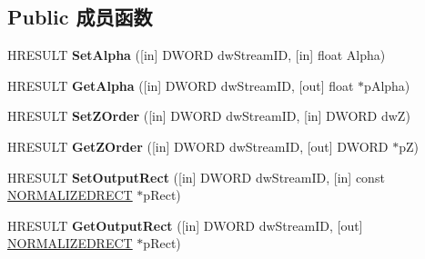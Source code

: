 \subsection*{Public 成员函数}
\begin{DoxyCompactItemize}
\item 
\mbox{\label{interface_i_v_m_r_mixer_control_a945398a75245376e673eef8d670ee8ea}} 
H\+R\+E\+S\+U\+LT {\bfseries Set\+Alpha} (\mbox{[}in\mbox{]} D\+W\+O\+RD dw\+Stream\+ID, \mbox{[}in\mbox{]} float Alpha)
\item 
\mbox{\label{interface_i_v_m_r_mixer_control_abc56a560bc55e58c50e1953df50ef94d}} 
H\+R\+E\+S\+U\+LT {\bfseries Get\+Alpha} (\mbox{[}in\mbox{]} D\+W\+O\+RD dw\+Stream\+ID, \mbox{[}out\mbox{]} float $\ast$p\+Alpha)
\item 
\mbox{\label{interface_i_v_m_r_mixer_control_a9f0a869204a6851c23c1bc183b7a43ba}} 
H\+R\+E\+S\+U\+LT {\bfseries Set\+Z\+Order} (\mbox{[}in\mbox{]} D\+W\+O\+RD dw\+Stream\+ID, \mbox{[}in\mbox{]} D\+W\+O\+RD dwZ)
\item 
\mbox{\label{interface_i_v_m_r_mixer_control_a538097d41cedb5271b295a8618583782}} 
H\+R\+E\+S\+U\+LT {\bfseries Get\+Z\+Order} (\mbox{[}in\mbox{]} D\+W\+O\+RD dw\+Stream\+ID, \mbox{[}out\mbox{]} D\+W\+O\+RD $\ast$pZ)
\item 
\mbox{\label{interface_i_v_m_r_mixer_control_aa7d10c5a19cc890e399cb9d5526cd79c}} 
H\+R\+E\+S\+U\+LT {\bfseries Set\+Output\+Rect} (\mbox{[}in\mbox{]} D\+W\+O\+RD dw\+Stream\+ID, \mbox{[}in\mbox{]} const \hyperlink{struct___n_o_r_m_a_l_i_z_e_d_r_e_c_t}{N\+O\+R\+M\+A\+L\+I\+Z\+E\+D\+R\+E\+CT} $\ast$p\+Rect)
\item 
\mbox{\label{interface_i_v_m_r_mixer_control_ab6e21e17a0adf0601271d665442acb9a}} 
H\+R\+E\+S\+U\+LT {\bfseries Get\+Output\+Rect} (\mbox{[}in\mbox{]} D\+W\+O\+RD dw\+Stream\+ID, \mbox{[}out\mbox{]} \hyperlink{struct___n_o_r_m_a_l_i_z_e_d_r_e_c_t}{N\+O\+R\+M\+A\+L\+I\+Z\+E\+D\+R\+E\+CT} $\ast$p\+Rect)
\item 
\mbox{\label{interface_i_v_m_r_mixer_control_acf3149903584784d8b7373f887cc90e9}} 

\end{DoxyCompactItemize}
